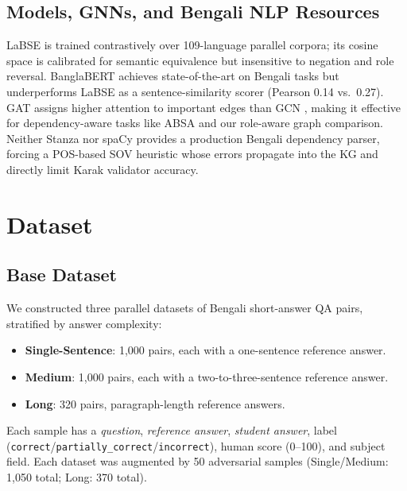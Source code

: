 \documentclass[11pt]{article}
\begin{document}
\subsection{Models, GNNs, and Bengali NLP Resources}

LaBSE \citep{feng2022labse} is trained contrastively over 109-language parallel corpora; its cosine space is calibrated for semantic equivalence but insensitive to negation and role reversal. BanglaBERT \citep{bhattacharjee-etal-2022-banglabert} achieves state-of-the-art on Bengali tasks but underperforms LaBSE as a sentence-similarity scorer (Pearson 0.14 vs.\ 0.27). GAT \citep{velivckovic2018graph} assigns higher attention to important edges than GCN \citep{kipf-welling-2017-semi}, making it effective for dependency-aware tasks like ABSA \citep{zhang2019aspect} and our role-aware graph comparison. Neither Stanza \citep{qi-etal-2020-stanza} nor spaCy provides a production Bengali dependency parser, forcing a POS-based SOV heuristic whose errors propagate into the KG and directly limit Karak validator accuracy.

\section{Dataset}

\subsection{Base Dataset}

We constructed three parallel datasets of Bengali short-answer QA pairs, stratified by answer complexity:

\begin{itemize}
  \item \textbf{Single-Sentence}: 1{,}000 pairs, each with a one-sentence reference answer.
  \item \textbf{Medium}: 1{,}000 pairs, each with a two-to-three-sentence reference answer.
  \item \textbf{Long}: 320 pairs, paragraph-length reference answers.
\end{itemize}

Each sample has a \emph{question}, \emph{reference answer}, \emph{student answer}, label (\texttt{correct}/\texttt{partially\_correct}/\texttt{incorrect}), human score (0--100), and subject field. Each dataset was augmented by 50 adversarial samples (Single/Medium: 1{,}050 total; Long: 370 total).
\end{document}
